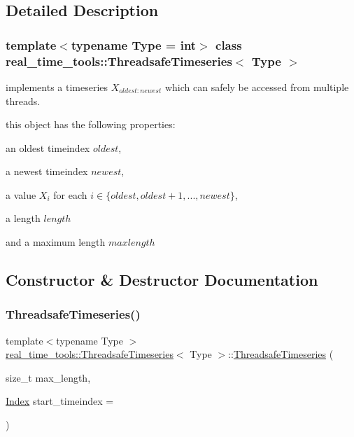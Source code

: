 \subsection{Detailed Description}
\subsubsection*{template$<$typename Type = int$>$\newline
class real\+\_\+time\+\_\+tools\+::\+Threadsafe\+Timeseries$<$ Type $>$}

implements a timeseries $ X_{{oldest}:{newest}} $ which can safely be accessed from multiple threads. 

this object has the following properties\+:
\begin{DoxyItemize}
\item an oldest timeindex $ oldest$,
\item a newest timeindex $ newest $,
\item a value $ X_i $ for each $ i \in \{oldest, oldest + 1 , ..., newest\} $,
\item a length $length$
\item and a maximum length $maxlength$ 
\end{DoxyItemize}

\subsection{Constructor \& Destructor Documentation}
\mbox{\label{classreal__time__tools_1_1ThreadsafeTimeseries_a06769598feb483bda198edb9c88c8de4}} 
\subsubsection{\texorpdfstring{Threadsafe\+Timeseries()}{ThreadsafeTimeseries()}}
{\footnotesize\ttfamily template$<$typename Type $>$ \\
\hyperlink{classreal__time__tools_1_1ThreadsafeTimeseries}{real\+\_\+time\+\_\+tools\+::\+Threadsafe\+Timeseries}$<$ Type $>$\+::\hyperlink{classreal__time__tools_1_1ThreadsafeTimeseries}{Threadsafe\+Timeseries} (\begin{DoxyParamCaption}\item[{size\+\_\+t}]{max\+\_\+length,  }\item[{\hyperlink{classreal__time__tools_1_1ThreadsafeTimeseries_a9364696c534468d7ad927883b16ca981}{Index}}]{start\+\_\+timeindex = {} }\end{DoxyParamCaption})}



